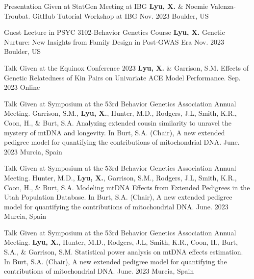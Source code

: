 \begin{cventries2}
    \cventryx
	{Presentation Given at StatGen Meeting at IBG} %
    {\textbf{Lyu, X.} \& Noemie Valenza-Troubat. GitHub Tutorial Workshop at IBG} 
    {Nov. 2023} %
    {Boulder, US}
    
    \cventryx
	{Guest Lecture in PSYC 3102-Behavior Genetics Course} %
    {\textbf{Lyu, X.} Genetic Nurture: New Insights from Family Design in Post-GWAS Era} 
    {Nov. 2023} %
    {Boulder, US}
    
    \cventryx
	{Talk Given at the Equinox Conference 2023 } %
    {\textbf{Lyu, X.} \& Garrison, S.M. Effects of Genetic Relatedness of Kin Pairs on Univariate ACE Model Performance.} 
    {Sep. 2023} %
    {Online}
    
    \cventryx
	{Talk Given at Symposium at the 53rd Behavior Genetics Association Annual Meeting. } %
    {Garrison, S.M., \textbf{Lyu, X.}, Hunter, M.D., Rodgers, J.L, Smith, K.R., Coon, H., \& Burt, S.A. Analyzing extended cousin similarity to unravel the mystery of mtDNA and longevity. In Burt, S.A. (Chair), A new extended pedigree model for quantifying the contributions of mitochondrial DNA.} 
    {June. 2023} %
    {Murcia, Spain}
    
    \cventryx
	{Talk Given at Symposium at the 53rd Behavior Genetics Association Annual Meeting. } %
    {Hunter, M.D., \textbf{Lyu, X.}, Garrison, S.M., Rodgers, J.L, Smith, K.R., Coon, H., \& Burt, S.A. Modeling mtDNA Effects from Extended Pedigrees in the Utah Population Database. In Burt, S.A. (Chair), A new extended pedigree model for quantifying the contributions of mitochondrial DNA.} 
    {June. 2023} %
    {Murcia, Spain}
    
    \cventryx
	{Talk Given at Symposium at the 53rd Behavior Genetics Association Annual Meeting. } %
    {\textbf{Lyu, X.}, Hunter, M.D., Rodgers, J.L, Smith, K.R., Coon, H., Burt, S.A., \& Garrison, S.M.  Statistical power analysis on mtDNA effects estimation. In Burt, S.A. (Chair), A new extended pedigree model for quantifying the contributions of mitochondrial DNA.} 
    {June. 2023} %
    {Murcia, Spain}
    

\end{cventries2}
